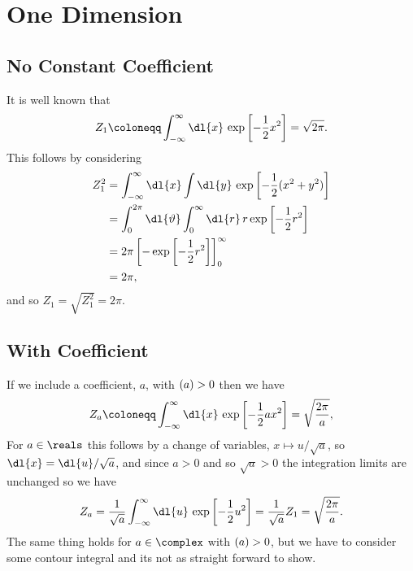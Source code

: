 \documentclass[fleqn]{NotesClass}
\let\Re\relax
\DeclareMathOperator{\Re}{Re}
\begin{document}
    \section{One Dimension}
    \subsection{No Constant Coefficient}
    It is well known that
    \begin{equation}
        Z_{1} \coloneqq \int_{-\infty}^{\infty} \dl{x} \, \exp\left[ -\frac{1}{2}x^2 \right] = \sqrt{2\pi}.
    \end{equation}
    This follows by considering
    \begin{align}
        Z_{1}^2 &= \int_{-\infty}^{\infty} \dl{x} \int \dl{y} \, \exp\left[ -\frac{1}{2}(x^2 + y^2) \right]\\
        &= \int_{0}^{2\pi} \dl{\vartheta} \int_{0}^{\infty} \dl{r} \, r \exp\left[ -\frac{1}{2}r^2 \right]\\
        &= 2\pi \left[ -\exp\left[ -\frac{1}{2}r^2 \right] \right]_{0}^{\infty}\\
        &= 2\pi,
    \end{align}
    and so \(Z_1 = \sqrt{Z_1^2} = 2\pi\).
    
    \subsection{With Coefficient}
    If we include a coefficient, \(a\), with \(\Re(a) > 0\) then we have
    \begin{equation}
        Z_a \coloneqq \int_{-\infty}^{\infty} \dl{x} \, \exp\left[ -\frac{1}{2}ax^2 \right] = \sqrt{\frac{2\pi}{a}},
    \end{equation}
    For \(a \in \reals\) this follows by a change of variables, \(x \mapsto u/\sqrt{a}\), so \(\dl{x} = \dl{u}/\sqrt{a}\), and since \(a > 0\) and so \(\sqrt{a} > 0\) the integration limits are unchanged so we have
    \begin{equation}
        Z_a = \frac{1}{\sqrt{a}} \int_{-\infty}^{\infty} \dl{u} \, \exp\left[ -\frac{1}{2}u^2 \right] = \frac{1}{\sqrt{a}} Z_1 = \sqrt{\frac{2\pi}{a}}.
    \end{equation}
    The same thing holds for \(a \in \complex\) with \(\Re(a) > 0\), but we have to consider some contour integral and its not as straight forward to show.
    
\end{document}
